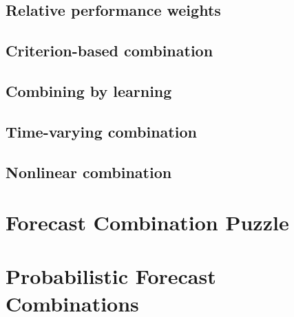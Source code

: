 \documentclass[11pt]{article}
\begin{document}
\subsection{Relative performance weights}

\subsection{Criterion-based combination}

\subsection{Combining by learning}

\subsection{Time-varying combination}

\subsection{Nonlinear combination}


\section{Forecast Combination Puzzle}


\section{Probabilistic Forecast Combinations}






\end{document}
